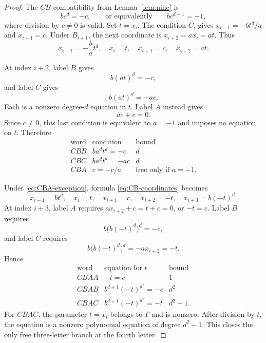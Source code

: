 \documentclass[11pt]{article}
\theoremstyle{definition}
\theoremstyle{remark}
\begin{document}
\begin{proof}
The \(CB\) compatibility from Lemma~\ref{lem:nine} is
\begin{equation}\label{eq:CB-compat}
 bc^d=-c,\qquad\text{or equivalently}\qquad bc^{d-1}=-1,
\end{equation}
where division by \(c\ne0\) is valid.  Set \(t=x_i\).  The condition \(C_i\)
gives \(x_{i-1}=-bt^d/a\) and \(x_{i+1}=c\).  Under \(B_{i+1}\), the next
coordinate is \(x_{i+2}=a x_i=at\).  Thus
\begin{equation}\label{eq:CB-coordinates}
 x_{i-1}=-\frac ba t^d,\quad x_i=t,\quad
 x_{i+1}=c,\quad x_{i+2}=at.
\end{equation}

At index \(i+2\), label \(B\) gives
\[
 b(at)^d=-c,
\]
and label \(C\) gives
\[
 b(at)^d=-ac.
\]
Each is a nonzero degree-\(d\) equation in \(t\).  Label \(A\) instead gives
\[
 ac+c=0.
\]
Since \(c\ne0\), this last condition is equivalent to \(a=-1\) and imposes
no equation on \(t\).  Therefore
\begin{equation}\label{eq:CB-third}
\begin{array}{c|c|c}
 \text{word}&\text{condition}&\text{bound}\\ \hline
 CBB&ba^dt^d=-c&d\\
 CBC&ba^dt^d=-ac&d\\
 CBA&c=-c/a&\text{free only if }a=-1.
\end{array}
\end{equation}

Under \eqref{eq:CBA-exception}, formula \eqref{eq:CB-coordinates} becomes
\begin{equation}\label{eq:CBA-coordinates}
 x_{i-1}=bt^d,\quad x_i=t,\quad x_{i+1}=c,\quad
 x_{i+2}=-t,\quad x_{i+3}=b(-t)^d.
\end{equation}
At index \(i+3\), label \(A\) requires
\(a x_{i+2}+c=t+c=0\), or \(-t=c\).  Label \(B\) requires
\[
 b\bigl(b(-t)^d\bigr)^d=-c,
\]
and label \(C\) requires
\[
 b\bigl(b(-t)^d\bigr)^d=-a x_{i+2}=-t.
\]
Hence
\begin{equation}\label{eq:CBA-close}
\begin{array}{c|c|c}
 \text{word}&\text{equation for }t&\text{bound}\\ \hline
 CBAA&-t=c&1\\
 CBAB&b^{d+1}(-t)^{d^2}=-c&d^2\\
 CBAC&b^{d+1}(-t)^{d^2}=-t&d^2-1.
\end{array}
\end{equation}
For \(CBAC\), the parameter \(t=x_i\) belongs to \(\Gamma\) and is nonzero.
After division by \(t\), the equation is a nonzero polynomial equation of
degree \(d^2-1\).  This closes the only free three-letter branch at the
fourth letter.
\end{proof}
\end{document}
